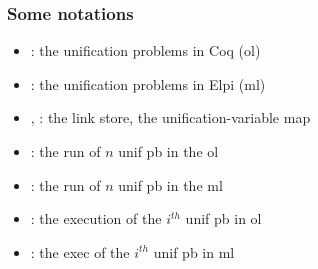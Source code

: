 \documentclass{pres}
\newcommand{\sepFrame}[1]{
  \section{#1}
  \begin{frame}
    \centering
    {\usebeamerfont*{frametitle}\usebeamercolor[fg]{frametitle} #1}
  \end{frame}
}
\begin{document}


\def\llam{\ensuremath{{\mathcal{L}_\lambda}}\xspace}
\begin{frame}
  \frametitle{Some notations}

  \begin{itemize}
    \item \foUnifPb: the unification problems in Coq (ol)
    \item \hoUnifPb: the unification problems in Elpi (ml)
    \item \linkStore, \mapStore: the link store, the unification-variable map
  \end{itemize}

  \mysep

  \begin{itemize}
    \item {}: the run of $n$ unif pb in the ol
    \item {}: the run of $n$ unif pb in the ml
    \item {}: the execution of the $i^{th}$ unif pb in ol
    \item {}: the exec of the $i^{th}$ unif pb in ml
  \end{itemize}


\end{frame}
\end{document}

